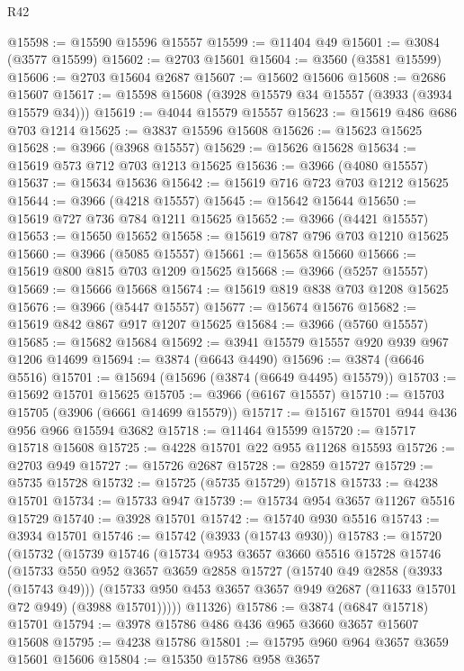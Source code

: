 \begin{lexlean}{R42}
\begin{coremodule}
@15598 := @15590 @15596 @15557
@15599 := @11404 @49
@15601 := @3084 (@3577 @15599)
@15602 := @2703 @15601
@15604 := @3560 (@3581 @15599)
@15606 := @2703 @15604 @2687
@15607 := @15602 @15606
@15608 := @2686 @15607
@15617 := @15598 @15608 (@3928 @15579 @34 @15557 (@3933 (@3934 @15579 @34)))
@15619 := @4044 @15579 @15557
@15623 := @15619 @486 @686 @703 @1214
@15625 := @3837 @15596 @15608
@15626 := @15623 @15625
@15628 := @3966 (@3968 @15557)
@15629 := @15626 @15628
@15634 := @15619 @573 @712 @703 @1213 @15625
@15636 := @3966 (@4080 @15557)
@15637 := @15634 @15636
@15642 := @15619 @716 @723 @703 @1212 @15625
@15644 := @3966 (@4218 @15557)
@15645 := @15642 @15644
@15650 := @15619 @727 @736 @784 @1211 @15625
@15652 := @3966 (@4421 @15557)
@15653 := @15650 @15652
@15658 := @15619 @787 @796 @703 @1210 @15625
@15660 := @3966 (@5085 @15557)
@15661 := @15658 @15660
@15666 := @15619 @800 @815 @703 @1209 @15625
@15668 := @3966 (@5257 @15557)
@15669 := @15666 @15668
@15674 := @15619 @819 @838 @703 @1208 @15625
@15676 := @3966 (@5447 @15557)
@15677 := @15674 @15676
@15682 := @15619 @842 @867 @917 @1207 @15625
@15684 := @3966 (@5760 @15557)
@15685 := @15682 @15684
@15692 := @3941 @15579 @15557 @920 @939 @967 @1206 @14699
@15694 := @3874 (@6643 @4490)
@15696 := @3874 (@6646 @5516)
@15701 := @15694 (@15696 (@3874 (@6649 @4495) @15579))
@15703 := @15692 @15701 @15625
@15705 := @3966 (@6167 @15557)
@15710 := @15703 @15705 (@3906 (@6661 @14699 @15579))
@15717 := @15167 @15701 @944 @436 @956 @966 @15594 @3682
@15718 := @11464 @15599
@15720 := @15717 @15718 @15608
@15725 := @4228 @15701 @22 @955 @11268 @15593
@15726 := @2703 @949
@15727 := @15726 @2687
@15728 := @2859 @15727
@15729 := @5735 @15728
@15732 := @15725 (@5735 @15729) @15718
@15733 := @4238 @15701
@15734 := @15733 @947
@15739 := @15734 @954 @3657 @11267 @5516 @15729
@15740 := @3928 @15701
@15742 := @15740 @930 @5516
@15743 := @3934 @15701
@15746 := @15742 (@3933 (@15743 @930))
@15783 := @15720
    (@15732
      (@15739
        @15746
        (@15734
          @953
          @3657
          @3660
          @5516
          @15728
          @15746
          (@15733
            @550
            @952
            @3657
            @3659
            @2858
            @15727
            (@15740 @49 @2858 (@3933 (@15743 @49)))
            (@15733 @950 @453 @3657 @3657 @949 @2687 (@11633 @15701 @72 @949) (@3988 @15701)))))
      @11326)
@15786 := @3874 (@6847 @15718) @15701
@15794 := @3978 @15786 @486 @436 @965 @3660 @3657 @15607 @15608
@15795 := @4238 @15786
@15801 := @15795 @960 @964 @3657 @3659 @15601 @15606
@15804 := @15350 @15786 @958 @3657

\end{coremodule}
\end{lexlean}
